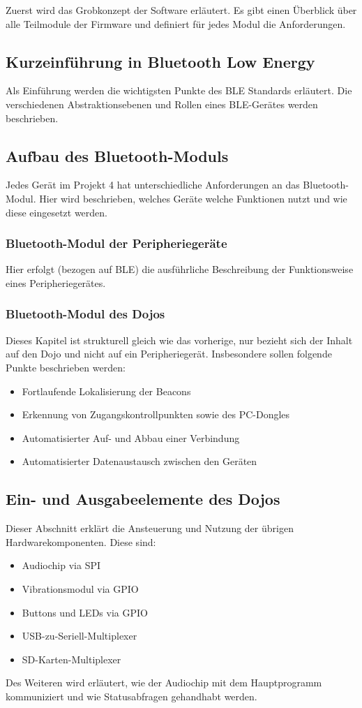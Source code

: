 Zuerst wird das Grobkonzept der Software erläutert. Es gibt einen Überblick über alle Teilmodule der Firmware und definiert für jedes Modul die Anforderungen.

\subsection{Kurzeinführung in Bluetooth Low Energy}
Als Einführung werden die wichtigsten Punkte des BLE Standards erläutert. Die verschiedenen Abstraktionsebenen und Rollen eines BLE-Gerätes werden beschrieben.

\subsection{Aufbau des Bluetooth-Moduls}
Jedes Gerät im Projekt 4 hat unterschiedliche Anforderungen an das Bluetooth-Modul. Hier wird beschrieben, welches Geräte welche Funktionen nutzt und wie diese eingesetzt werden.

\subsubsection{Bluetooth-Modul der Peripheriegeräte}
Hier erfolgt (bezogen auf BLE) die ausführliche Beschreibung der Funktionsweise eines Peripheriegerätes.

\subsubsection{Bluetooth-Modul des Dojos}
Dieses Kapitel ist strukturell gleich wie das vorherige, nur bezieht sich der Inhalt auf den Dojo und nicht auf ein Peripheriegerät. Insbesondere sollen folgende Punkte beschrieben werden:
\begin{itemize}
\item Fortlaufende Lokalisierung der Beacons
\item Erkennung von Zugangskontrollpunkten sowie des PC-Dongles
\item Automatisierter Auf- und Abbau einer Verbindung
\item Automatisierter Datenaustausch zwischen den Geräten
\end{itemize}

\subsection{Ein- und Ausgabeelemente des Dojos}
Dieser Abschnitt erklärt die Ansteuerung und Nutzung der übrigen Hardwarekomponenten. Diese sind:
\begin{itemize}
\item Audiochip via SPI
\item Vibrationsmodul via GPIO
\item Buttons und LEDs via GPIO
\item USB-zu-Seriell-Multiplexer
\item SD-Karten-Multiplexer
\end{itemize}
Des Weiteren wird erläutert, wie der Audiochip mit dem Hauptprogramm kommuniziert und wie Statusabfragen gehandhabt werden.

